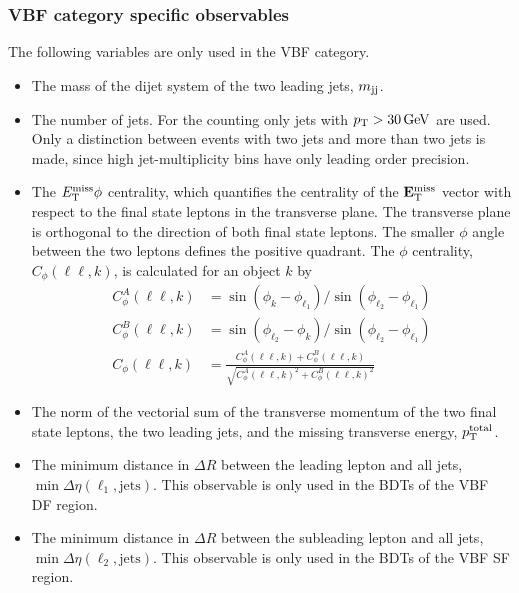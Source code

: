 \subsubsection{VBF category specific observables}
The following variables are only used in the VBF category.
\begin{itemize}
    \item The mass of the dijet system of the two leading jets, $m_{\text{jj}}$.
    \item The number of jets. For the counting only jets with $\pt > \SI{30}{\GeV}$ are used.
          Only a distinction between events with two jets and more than two jets is made, since high jet-multiplicity bins
          have only leading order precision.
    \item The $E_\text{T}^\text{miss} \phi$ centrality, which quantifies the centrality of the $\mathbf{E}_\text{T}^\text{miss}$ vector with respect to the final
          state leptons in the transverse plane.
          The transverse plane is orthogonal to the direction of both final state leptons. The smaller $\phi$ angle between
          the two leptons defines the positive quadrant.
          The $\phi$ centrality, $C_\phi(\ell\ell,k)$, is calculated for an object $k$ by~\cite{SchilloPhd}
          \begin{align}
              \label{eq:mva:metphicentrality}
              C_\phi^A(\ell\ell,k) &= \sin(\phi_k - \phi_{\ell_1}) / \sin(\phi_{\ell_2} - \phi_{\ell_1}) \\
              C_\phi^B(\ell\ell,k) &= \sin(\phi_{\ell_2} - \phi_k) / \sin(\phi_{\ell_2} - \phi_{\ell_1}) \\
              C_\phi(\ell\ell,k) &=  \frac{C_\phi^A(\ell\ell,k) + C_\phi^B(\ell\ell,k)}{\sqrt{C_\phi^A{(\ell\ell,k)}^2 + C_\phi^B{(\ell\ell,k)}^2}}
          \end{align}
    \item The norm of the vectorial sum of the transverse momentum of the two final state leptons, the two leading jets, and the missing transverse energy, $p_\text{T}^\text{total}$.
    \item The minimum distance in $\Delta R$ between the leading lepton and all jets, $\min \Delta \eta (\ell_1, \text{jets})$.
            This observable is only used in the BDTs of the VBF DF region.
    \item The minimum distance in $\Delta R$ between the subleading lepton and all jets, $\min \Delta \eta (\ell_2, \text{jets})$.
            This observable is only used in the BDTs of the VBF SF region.
\end{itemize}

